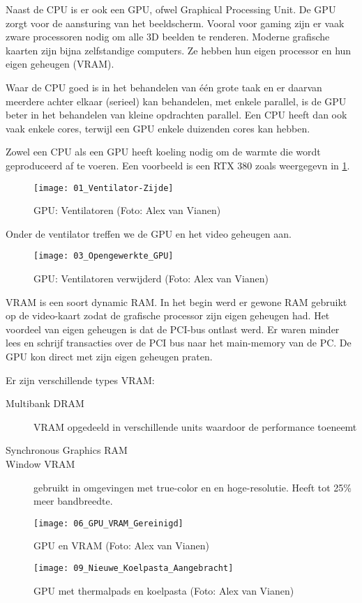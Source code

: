 Naast de CPU is er ook een GPU, ofwel Graphical Processing Unit. De GPU zorgt voor de aansturing van het beeldscherm. Vooral voor gaming zijn er vaak zware processoren nodig om alle 3D beelden te renderen. Moderne grafische kaarten zijn bijna zelfstandige computers. Ze hebben hun eigen processor en hun eigen geheugen (VRAM).

Waar de CPU goed is in het behandelen van \'e\'en grote taak en er daarvan meerdere achter elkaar (serieel) kan behandelen, met enkele parallel, is de GPU beter in het behandelen van kleine opdrachten parallel. Een CPU heeft dan ook vaak enkele cores, terwijl een GPU enkele duizenden cores kan hebben.

Zowel een CPU als een GPU heeft koeling nodig om de warmte die wordt geproduceerd af te voeren. Een voorbeeld is een RTX 380 zoals weergegevn in \ref{fig:gpu:ventilator}.

\begin{figure}[h]
\texttt{[image: 01\_Ventilator-Zijde]}
\centering
	\caption{GPU: Ventilatoren (Foto: Alex van Vianen)}
\label{fig:gpu:ventilator}
\end{figure}

Onder de ventilator treffen we de GPU en het video geheugen aan.

\begin{figure}[h]
\texttt{[image: 03\_Opengewerkte\_GPU]}
\centering
	\caption{GPU: Ventilatoren verwijderd (Foto: Alex van Vianen)}
\label{fig:gpu:open}
\end{figure}

VRAM is een soort dynamic RAM. In het begin werd er gewone RAM gebruikt op de video-kaart zodat de grafische processor zijn eigen geheugen had. Het voordeel van eigen geheugen is dat de PCI-bus ontlast werd. Er waren minder lees en schrijf transacties over de PCI bus naar het main-memory van de PC. De GPU kon direct met zijn eigen geheugen praten.

Er zijn verschillende types VRAM:
\begin{description}
	\item [Multibank DRAM] VRAM opgedeeld in verschillende units waardoor de performance toeneemt
	\item [Synchronous Graphics RAM] 
	\item [Window VRAM] gebruikt in omgevingen met true-color en en hoge-resolutie. Heeft tot 25\% meer bandbreedte.
\end{description}

\begin{figure}[h]
\texttt{[image: 06\_GPU\_VRAM\_Gereinigd]}
\centering
	\caption{GPU en VRAM (Foto: Alex van Vianen)}
\label{fig:gpuvram}
\end{figure}

\begin{figure}[h]
\texttt{[image: 09\_Nieuwe\_Koelpasta\_Aangebracht]}
\centering
	\caption{GPU met thermalpads en koelpasta (Foto: Alex van Vianen)}
\label{fig:gputhermalpasta}
\end{figure}

